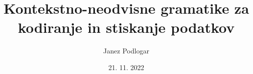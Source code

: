 \documentclass{beamer}
\title[Gramatike za kodiranje podatkov]{Kontekstno-neodvisne gramatike za kodiranje in stiskanje podatkov}
\author{Janez Podlogar}
\institute[UL-FMF]{Univerza v Ljubljani, Fakulteta za matematiko in fiziko}
\date[November1 2022]{21. 11. 2022}
\begin{document}
\begin{frame}
    \titlepage
\end{frame}
\end{document}
